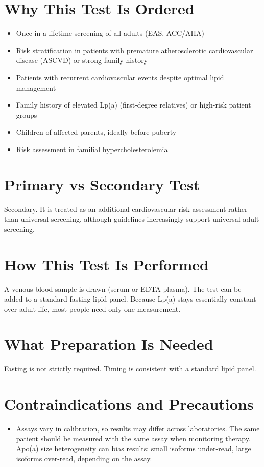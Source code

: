 \section*{Why This Test Is Ordered}
\begin{itemize}
  \item Once-in-a-lifetime screening of all adults (EAS, ACC/AHA)
  \item Risk stratification in patients with premature atherosclerotic cardiovascular disease (ASCVD) or strong family history
  \item Patients with recurrent cardiovascular events despite optimal lipid management
  \item Family history of elevated Lp(a) (first-degree relatives) or high-risk patient groups
  \item Children of affected parents, ideally before puberty
  \item Risk assessment in familial hypercholesterolemia
\end{itemize}

\section*{Primary vs Secondary Test}
Secondary. It is treated as an additional cardiovascular risk assessment rather than universal screening, although guidelines increasingly support universal adult screening.

\section*{How This Test Is Performed}
A venous blood sample is drawn (serum or EDTA plasma). The test can be added to a standard fasting lipid panel. Because Lp(a) stays essentially constant over adult life, most people need only one measurement.

\section*{What Preparation Is Needed}
Fasting is not strictly required. Timing is consistent with a standard lipid panel.

\section*{Contraindications and Precautions}
\begin{itemize}
  \item Assays vary in calibration, so results may differ across laboratories. The same patient should be measured with the same assay when monitoring therapy. Apo(a) size heterogeneity can bias results: small isoforms under-read, large isoforms over-read, depending on the assay.
\end{itemize}
